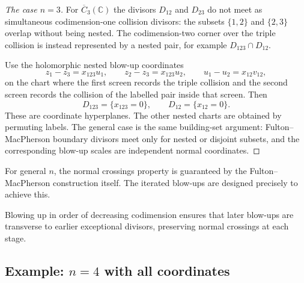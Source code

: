\begin{proof}[The case $n=3$]
For $\overline{C}_3(\mathbb C)$ the divisors $D_{12}$ and $D_{23}$ do
not meet as simultaneous codimension-one collision divisors: the
subsets $\{1,2\}$ and $\{2,3\}$ overlap without being nested. The
codimension-two corner over the triple collision is instead represented
by a nested pair, for example $D_{123}\cap D_{12}$.

Use the holomorphic nested blow-up coordinates
\[
 z_1-z_3=x_{123}u_1,\qquad
 z_2-z_3=x_{123}u_2,\qquad
 u_1-u_2=x_{12}v_{12},
\]
on the chart where the first screen records the triple collision and
the second screen records the collision of the labelled pair inside
that screen. Then
\[
D_{123}=\{x_{123}=0\},\qquad D_{12}=\{x_{12}=0\}.
\]
These are coordinate hyperplanes. The other nested charts are obtained
by permuting labels. The general case is the same building-set
argument: Fulton--MacPherson boundary divisors meet only for nested or
disjoint subsets, and the corresponding blow-up scales are independent
normal coordinates.
\end{proof}

\begin{remark}
For general $n$, the normal crossings property is guaranteed by the Fulton--MacPherson
construction itself. The iterated blow-ups are designed precisely to achieve this.

Blowing up in order of decreasing codimension ensures that later blow-ups
are transverse to earlier exceptional divisors, preserving normal crossings at each stage.
\end{remark}

\subsection{\texorpdfstring{Example: $n=4$ with all coordinates}{Example: n=4 with all coordinates}}


